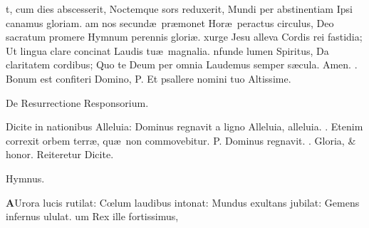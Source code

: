 \documentclass[letter,11pt]{book}
\makeatletter
\DeclareRobustCommand{\Vbar}{\vers@resp{-0.1em}{V}}
\newcommand{\vers@resp@sym}{\raisebox{0.2ex}{\rotatebox[origin=c]{-20}{$\m@th\rceil$}}}
\newcommand{\vers@resp}[2]{%
  {\ooalign{\hidewidth\kern#1\vers@resp@sym\hidewidth\cr#2\cr}}%
}%
\def\P{\color{Red} P. \color{black}}
\def\V{\color{Red} \Vbar . \color{black}}
\makeatother
\begin{document}
\begin{multicols*}{2}
t, cum dies abscesserit,
\newline \indent Noctemque sors reduxerit,
\newline \indent Mundi per abstinentiam
\newline \indent Ipsi canamus gloriam.
am nos secund\ae \ pr\ae monet
\newline \indent Hor\ae \ peractus circulus,
\newline \indent Deo sacratum promere
\newline \indent Hymnum perennis glori\ae .
xurge Jesu alleva
\newline \indent Cordis rei fastidia;
\newline \indent Ut lingua clare concinat
\newline \indent Laudis tu\ae \ magnalia.
nfunde lumen Spiritus,
\newline \indent Da claritatem cordibus;
\newline \indent Quo te Deum per omnia
\newline \indent Laudemus semper s\ae cula. Amen.
\newline \V Bonum est confiteri Domino, \P Et psallere nomini tuo Altissime.
\vspace{-.75em} \begin{center} \color{Red} De Resurrectione Responsorium. \end{center} \vspace{-.75em}
\par \noindent Dicite in nationibus Alleluia: Dominus regnavit a ligno Alleluia, alleluia. \V Etenim correxit orbem terr\ae , qu\ae \ non commovebitur. \P Dominus regnavit. \V Gloria, \& honor. \color{Red} Reiteretur \color{black} Dicite.
\vspace{-.5em} \begin{center} \color{Red} Hymnus. \end{center} \vspace{-.5em}
\lettrine[lines=2]{\bfseries \color{Red} A}{}Urora lucis rutilat:
\newline C\oe lum laudibus intonat:
\newline \indent Mundus exultans jubilat:
\newline \indent Gemens infernus ululat.
um Rex ille fortissimus,

\end{multicols*}
\end{document}
